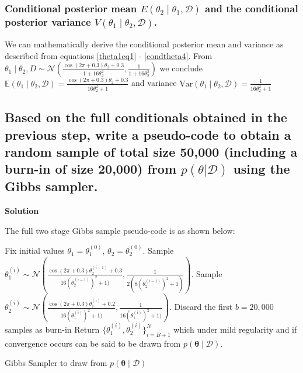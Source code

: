 \documentclass[12pt]{article}
\begin{document}
\subsubsection{Conditional posterior mean \(E(\theta_2 \mid \theta_1, \mathcal{D})\) and the conditional posterior variance \(V(\theta_1 \mid \theta_2, \mathcal{D})\).}

We can mathematically derive the conditional posterior mean and variance as described from equations \ref{theta1eq1} - \ref{condtheta4}.  From $\theta_1 \mid \theta_2, D \sim \mathcal{N} \left( \frac{\cos(2\pi+0.3)\theta_2 + 0.3}{1 + 16\theta_2^2}, \frac{1}{1 + 16\theta_2^2} \right)$ we conclude
$\mathbb{E}(\theta_1 \mid \theta_2, \mathcal{D}) = \frac{\cos(2\pi + 0.3)\theta_2 + 0.3}{16\theta_2^2 + 1}$ and variance  $  \mathrm{Var}(\theta_1 \mid \theta_2, \mathcal{D}) = \frac{1}{16\theta_2^2 + 1}$

\subsection{ Based on the full conditionals obtained in the previous step, write a pseudo-code to obtain a random sample of total size 50,000 (including a burn-in of size 20,000) from $p(\theta | \mathcal{D})$ using the Gibbs sampler.} 

\textbf{Solution}

The full two stage Gibbs sample pseudo-code is as shown below:
\begin{algorithm}
\begin{algorithmic}[1]
\State Fix initial values \( \theta_1 = \theta_1^{(0)} \), \( \theta_2 = \theta_2^{(0)} \).
    \State Sample \( \theta_1^{(i)} \sim \mathcal{N}\left(\frac{\cos(2\pi + 0.3)\theta_2^{(i-1)} + 0.3}{16(\theta_2^{(i-1)})^2 + 1)}, \frac{1}{2(8(\theta_2^{(i-1)})^2 + 1)}\right) \).
    \State Sample \( \theta_2^{(i)} \sim \mathcal{N}\left(\frac{\cos(2\pi + 0.3)\theta_1^{(i)} + 0.2}{16(\theta_1^{(i)})^2 + 1)}, \frac{1}{16(\theta_1^{(i)})^2 + 1)}\right) \).
\EndFor
\State Discard the first \( b = 20,000 \) samples as burn-in
\State Return \( \{\theta_1^{(i)}, \theta_2^{(i)}\}_{i=B+1}^{N} \) which under mild regularity and if convergence occurs can be said to be drawn from \( p(\boldsymbol{\theta} \mid \mathcal{D}) \).
\end{algorithmic}
\caption{ Gibbs Sampler to draw from \( p(\boldsymbol{\theta} \mid \mathcal{D}) \)}
\label{algo:gs}
\end{algorithm}
\end{document}
